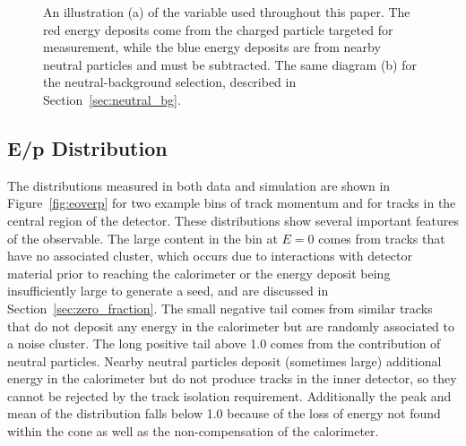\begin{figure}[htbp]
\centering
{}
\caption{An illustration (a) of the \ep variable used throughout this paper. The red energy deposits come from the charged particle targeted for measurement, while the blue energy deposits are from nearby neutral particles and must be subtracted. The same diagram (b) for the neutral-background selection, described in Section~\ref{sec:neutral_bg}.}
\label{fig:eoverp_cartoon}
\end{figure}

\subsection{E/p Distribution}

The \ep distributions measured in both data and simulation are shown in Figure~\ref{fig:eoverp} for two example bins of track momentum and for tracks in the central region of the detector. 
These distributions show several important features of the \ep observable.
The large content in the bin at $E=0$ comes from tracks that have no associated cluster, which occurs due to interactions with detector material prior to reaching the calorimeter or the energy deposit being insufficiently large to generate a seed, and are discussed in Section~\ref{sec:zero_fraction}.
The small negative tail comes from similar tracks that do not deposit any energy in the calorimeter but are randomly associated to a noise cluster.
The long positive tail above 1.0 comes from the contribution of neutral particles.
Nearby neutral particles deposit (sometimes large) additional energy in the calorimeter but do not produce tracks in the inner detector, so they cannot be rejected by the track isolation requirement.
Additionally the peak and mean of the distribution falls below 1.0 because of the loss of energy not found within the cone as well as the non-compensation of the calorimeter.

